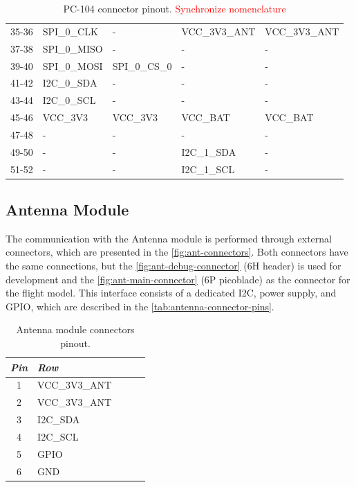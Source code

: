 \begin{table}[!h]
\begin{tabular}{cllll}
        35-36              & SPI\_0\_CLK      & -                & VCC\_3V3\_ANT & VCC\_3V3\_ANT \\
        37-38              & SPI\_0\_MISO     & -                & -             & -             \\
        39-40              & SPI\_0\_MOSI     & SPI\_0\_CS\_0    & -             & -             \\
        41-42              & I2C\_0\_SDA      & -                & -             & -             \\
        43-44              & I2C\_0\_SCL      & -                & -             & -             \\
        45-46              & VCC\_3V3         & VCC\_3V3         & VCC\_BAT      & VCC\_BAT      \\
        47-48              & -                & -                & -             & -             \\
        49-50              & -                & -                & I2C\_1\_SDA   & -             \\
        51-52              & -                & -                & I2C\_1\_SCL   & -             \\
        \bottomrule[1.5pt]
    \end{tabular}
    \caption{PC-104 connector pinout. \textcolor{red}{Synchronize nomenclature}}
    \label{tab:pc104-pins}
\end{table}

\subsection{Antenna Module}

The communication with the Antenna module is performed through external connectors, which are presented in the \autoref{fig:ant-connectors}. Both connectors have the same connections, but the \ref{fig:ant-debug-connector} (6H header) is used for development and the \ref{fig:ant-main-connector} (6P picoblade) as the connector for the flight model. This interface consists of a dedicated I2C, power supply, and GPIO, which are described in the \autoref{tab:antenna-connector-pins}.

\begin{table}[!h]
    \centering
    \begin{tabular}{cllll}
        \toprule[1.5pt]
        \textit{Pin} & \textit{Row} \\
        \midrule
        1            & VCC\_3V3\_ANT  \\
        2            & VCC\_3V3\_ANT  \\
        3            & I2C\_SDA       \\
        4            & I2C\_SCL       \\
        5            & GPIO           \\
        6            & GND            \\
        \bottomrule[1.5pt]
    \end{tabular}
    \caption{Antenna module connectors pinout.}
    \label{tab:antenna-connector-pins}
\end{table}

